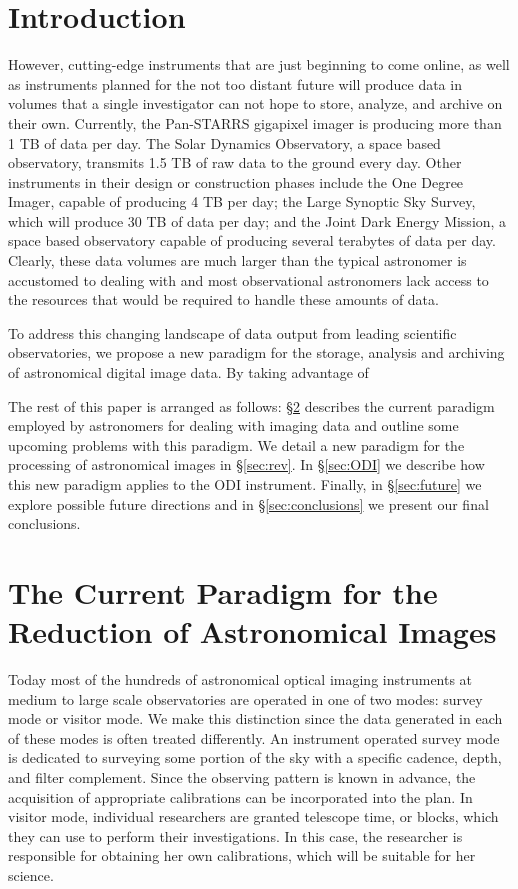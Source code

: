 \documentclass[10pt,conference]{IEEEtran}
\begin{document}
\section{Introduction}\label{sec:intro}

However, cutting-edge instruments that are just beginning to come online, as well as instruments planned for the not too distant future will produce data in volumes that a single investigator can not hope to store, analyze, and archive on their own. Currently, the Pan-STARRS gigapixel imager is producing more than 1 TB of data per day. The Solar Dynamics Observatory, a space based observatory, transmits 1.5 TB of raw data to the ground every day. Other instruments in their design or construction phases include the One Degree Imager, capable of producing 4 TB per day; the Large Synoptic Sky Survey, which will produce 30 TB of data per day; and the Joint Dark Energy Mission, a space based observatory capable of producing several terabytes of data per day. Clearly, these data volumes are much larger than the typical astronomer is accustomed to dealing with and most observational astronomers lack access to the resources that would be required to handle these amounts of data.

To address this changing landscape of data output from leading scientific observatories, we propose a new paradigm for the storage, analysis and archiving of astronomical digital image data. By taking advantage of

The rest of this paper is arranged as follows: \S\ref{sec:current} describes the current paradigm employed by astronomers for dealing with imaging data and outline some upcoming problems with this paradigm. We detail a new paradigm for the processing of astronomical images in \S\ref{sec:rev}. In \S\ref{sec:ODI} we describe how this new paradigm applies to the ODI instrument. Finally, in \S\ref{sec:future} we explore possible future directions and in \S\ref{sec:conclusions} we present our final conclusions.

\section{The Current Paradigm for the Reduction of Astronomical Images}\label{sec:current}

Today most of the hundreds of astronomical optical imaging instruments at medium to large scale observatories are operated in one of two modes: survey mode or visitor mode. We make this distinction since the data generated in each of these modes is often treated differently. An instrument operated survey mode is dedicated to surveying some portion of the sky with a specific cadence, depth, and filter complement. Since the observing pattern is known in advance, the acquisition of appropriate calibrations can be incorporated into the plan. In visitor mode, individual researchers are granted telescope time, or blocks, which they can use to perform their investigations. In this case, the researcher is responsible for obtaining her own calibrations, which will be suitable for her science. 
\end{document}
